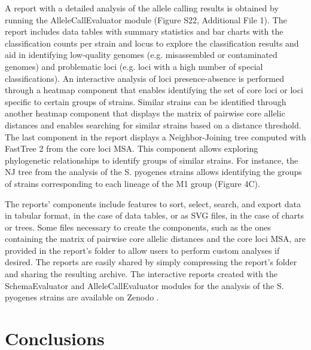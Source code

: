 A report with a detailed analysis of the allele calling results is obtained by running the AlleleCallEvaluator module (Figure S22, Additional File 1). The report includes data tables with summary statistics and bar charts with the classification counts per strain and locus to explore the classification results and aid in identifying low-quality genomes (e.g. misassembled or contaminated genomes) and problematic loci (e.g. loci with a high number of special classifications). An interactive analysis of loci presence-absence is performed through a heatmap component that enables identifying the set of core loci or loci specific to certain groups of strains. Similar strains can be identified through another heatmap component that displays the matrix of pairwise core allelic distances and enables searching for similar strains based on a distance threshold. The last component in the report displays a Neighbor-Joining tree computed with FastTree 2 \citep{price_fasttree_2010} from the core loci MSA. This component allows exploring phylogenetic relationships to identify groups of similar strains. For instance, the NJ tree from the analysis of the S. pyogenes strains allows identifying the groups of strains corresponding to each lineage of the M1 group (Figure 4C).

The reports' components include features to sort, select, search, and export data in tabular format, in the case of data tables, or as SVG files, in the case of charts or trees. Some files necessary to create the components, such as the ones containing the matrix of pairwise core allelic distances and the core loci MSA, are provided in the report's folder to allow users to perform custom analyses if desired. The reports are easily shared by simply compressing the report's folder and sharing the resulting archive. The interactive reports created with the SchemaEvaluator and AlleleCallEvaluator modules for the analysis of the S. pyogenes strains are available on Zenodo \citep{mamede_supplementary_2025}.

\section{Conclusions} \label{sec:conclusions}


